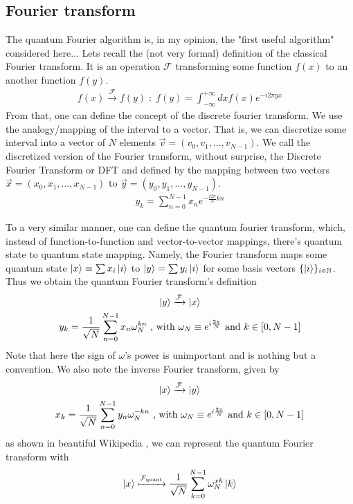 \subsection{Fourier transform}
The quantum Fourier algorithm is, in my opinion, the "first useful algorithm" considered here...
Lets recall the (not very formal) definition of the classical Fourier transform. It is an operation $\mathcal{F}$ 
transforming some function $f(x)$ to an another function $f(y)$.
\begin{gather}
  f(x) \xrightarrow{\mathcal{F}} f(y) \; : \; f(y) = \int^{+\infty}_{-\infty}dx f(x) e^{-i2\pi y x}
\end{gather}
From that, one can define the concept of the discrete fourier transform. We use the analogy/mapping of the 
interval to a vector. That is, we can discretize some interval into a vector of $N$ elements $\vec{v}=(v_0, v_1, ..., v_{N-1})$.
We call the discretized version of the Fourier transform, without surprise, the Discrete Fourier Transform or DFT and defined by the mapping 
between two vectors $\vec{x}=(x_0, x_1,..., x_{N-1})$ to $\vec{y}=(y_0, y_1,...,y_{N-1})$.
\begin{gather}
  y_k = \sum_{n=0}^{N-1} x_n e^{-\frac{i2\pi}{N}kn}
\end{gather}

To a very similar manner, one can define the quantum fourier transform, which, instead of function-to-function and vector-to-vector mappings, 
there's quantum state to quantum state mapping. Namely, the Fourier transform maps some quantum state $\ket{x}\equiv \sum x_i \ket{i}$ to 
$\ket{y}=\sum y_i\ket{i}$ for some basis vectors $\{\ket{i}\}_{i\in \mathbb{N}}$. Thus we obtain the quantum Fourier transform's definition 
\begin{gather}
  \ket{y}\xrightarrow{\mathcal{F}} \ket{x}\\
  y_k=\frac{1}{\sqrt{N}} \sum_{n=0}^{N-1} x_n \omega_N^{kn} \text{ , with } \omega_N \equiv e^{i\frac{2\pi}{N}} \text{ and } k\in [0, N-1]
  \label{eq:qft_definition_components}
\end{gather}
Note that here the sign of $\omega$'s power is unimportant and is nothing but a convention. We also note the inverse Fourier transform, given by 
\begin{gather}
  \ket{x}\xrightarrow{\mathcal{F}} \ket{y}\\
  x_k=\frac{1}{\sqrt{N}} \sum_{n=0}^{N-1} y_n \omega_N^{-kn} \text{ , with } \omega_N \equiv e^{i\frac{2\pi}{N}} \text{ and } k\in [0, N-1]
\end{gather}
as shown in beautiful Wikipedia \cite{noauthor_quantum_2022}, we can represent the quantum Fourier transform with 
\begin{gather}
  \ket{x} \xmapsto{\mathcal{F}_{\text{quant}}} \frac{1}{\sqrt{N}} \sum_{k=0}^{N-1}\omega_N^{xk}\ket{k}
  \label{eq:qft_mapsto}
\end{gather}

